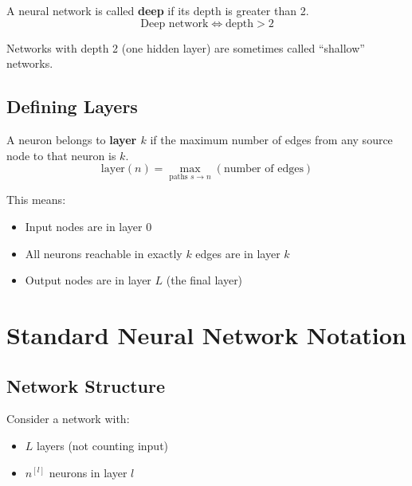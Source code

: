 \begin{definitionbox}
A neural network is called \textbf{deep} if its depth is greater than 2.
\[
\text{Deep network} \Leftrightarrow \text{depth} > 2
\]
\end{definitionbox}

Networks with depth 2 (one hidden layer) are sometimes called ``shallow'' networks.

\subsection{Defining Layers}

\begin{definitionbox}
A neuron belongs to \textbf{layer $k$} if the maximum number of edges from any source node to that neuron is $k$.
\[
\text{layer}(n) = \max_{\text{paths } s \to n} (\text{number of edges})
\]
\end{definitionbox}

This means:
\begin{itemize}
    \item Input nodes are in layer 0
    \item All neurons reachable in exactly $k$ edges are in layer $k$
    \item Output nodes are in layer $L$ (the final layer)
\end{itemize}


\section{Standard Neural Network Notation}

\subsection{Network Structure}

Consider a network with:
\begin{itemize}
    \item $L$ layers (not counting input)
    \item $n^{[l]}$ neurons in layer $l$
\end{itemize}

